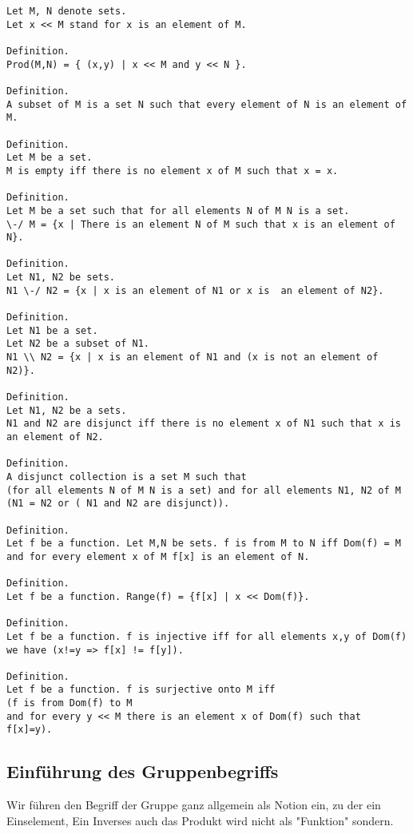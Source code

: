 \documentclass[a4paper,12pt]{scrartcl}
\begin{document}
\begin{lstlisting}
Let M, N denote sets.
Let x << M stand for x is an element of M.

Definition.
Prod(M,N) = { (x,y) | x << M and y << N }.

Definition.
A subset of M is a set N such that every element of N is an element of M.

Definition.
Let M be a set.
M is empty iff there is no element x of M such that x = x.

Definition.
Let M be a set such that for all elements N of M N is a set.
\-/ M = {x | There is an element N of M such that x is an element of N}.

Definition.
Let N1, N2 be sets.
N1 \-/ N2 = {x | x is an element of N1 or x is  an element of N2}.

Definition.
Let N1 be a set.
Let N2 be a subset of N1.
N1 \\ N2 = {x | x is an element of N1 and (x is not an element of N2)}.

Definition.
Let N1, N2 be a sets.
N1 and N2 are disjunct iff there is no element x of N1 such that x is an element of N2.

Definition.
A disjunct collection is a set M such that 
(for all elements N of M N is a set) and for all elements N1, N2 of M (N1 = N2 or ( N1 and N2 are disjunct)).

Definition.
Let f be a function. Let M,N be sets. f is from M to N iff Dom(f) = M and for every element x of M f[x] is an element of N.

Definition.
Let f be a function. Range(f) = {f[x] | x << Dom(f)}.

Definition.
Let f be a function. f is injective iff for all elements x,y of Dom(f) we have (x!=y => f[x] != f[y]).

Definition.
Let f be a function. f is surjective onto M iff 
(f is from Dom(f) to M 
and for every y << M there is an element x of Dom(f) such that f[x]=y).
\end{lstlisting}

\subsection{Einführung des Gruppenbegriffs}

Wir führen den Begriff der Gruppe ganz allgemein als Notion ein, zu der ein Einselement, Ein Inverses auch das Produkt wird nicht als "Funktion" sondern.
\end{document}
